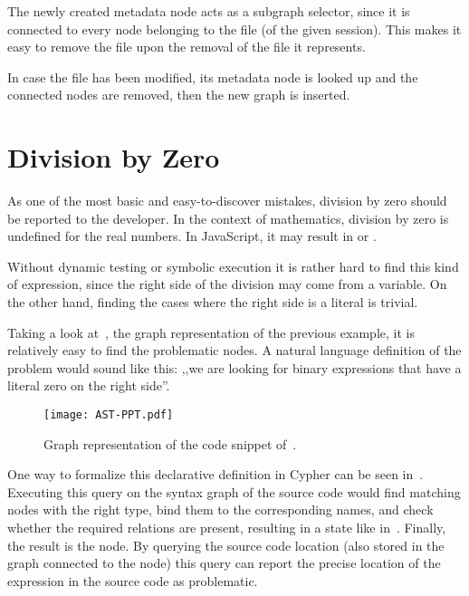 The newly created metadata node acts as a subgraph selector, since it is connected to every node belonging to the file (of the given session). This makes it easy to remove the file upon the removal of the file it represents.

In case the file has been modified, its metadata node is looked up and the connected nodes are removed, then the new graph is inserted.


\section{Division by Zero}
\label{sect:division-by-zero}
As one of the most basic and easy-to-discover mistakes, division by zero should be reported to the developer. In the context of mathematics, division by zero is undefined for the real numbers. In JavaScript, it may result in  or .

Without dynamic testing or symbolic execution it is rather hard to find this kind of expression, since the right side of the division may come from a variable. On the other hand, finding the cases where the right side is a literal is trivial.

Taking a look at~, the graph representation of the previous example, it is relatively easy to find the problematic nodes. A natural language definition of the problem would sound like this: ,,we are looking for binary expressions that have a literal zero on the right side''.

\begin{figure}[!htb]
  \centering
  \texttt{[image: AST-PPT.pdf]}
  \caption{Graph representation of the code snippet of~.}
  \label{fig:AST-PPT}
\end{figure}

One way to formalize this declarative definition in Cypher can be seen in~. Executing this query on the syntax graph of the source code would find matching nodes with the right type, bind them to the corresponding names, and check whether the required relations are present, resulting in a state like in~. Finally, the result is the  node. By querying the source code location (also stored in the graph connected to the node) this query can report the precise location of the expression in the source code as problematic.

\begin{figure}[!htb]
	\begin{minipage}{\textwidth}
		
	\end{minipage}
\end{figure}

